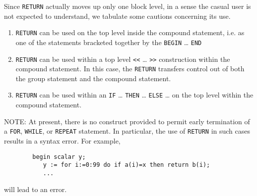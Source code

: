 Since \texttt{RETURN} actually moves up only one
block level, in a sense the casual user is not expected to
understand, we tabulate some cautions concerning its use.
\begin{enumerate}
\item \texttt{RETURN} can be used on the top level inside the compound
statement, i.e. as one of the statements bracketed together by the 
\texttt{BEGIN} \ldots{} \texttt{END}

\item \texttt{RETURN} can be used within a top level \texttt{<<}
  \ldots{} \texttt{>>} construction within the compound statement. In
  this case, the \texttt{RETURN} transfers control out of both the
  group statement and the compound statement.

\item \texttt{RETURN} can be used within an \texttt{IF} \ldots{}
  \texttt{THEN} \ldots{} \texttt{ELSE} \ldots{} on the top level within
  the compound statement.
\end{enumerate}
NOTE:  At present, there is no construct provided to permit early
termination of a \texttt{FOR}, \texttt{WHILE},
or \texttt{REPEAT} statement.  In particular, the use of
\texttt{RETURN} in such cases results in a syntax error.  For example,
\begin{verbatim}
        begin scalar y;
           y := for i:=0:99 do if a(i)=x then return b(i);
           ...
\end{verbatim}
will lead to an error.

